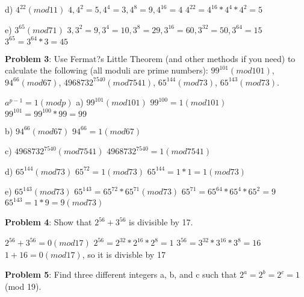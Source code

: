 \documentclass[12pt,letterpaper,final]{report}
\begin{document}
 d) $4^{22} (mod 11)$
\newline $4, 4^{2} = 5, 4^{4} = 3, 4^{8} = 9, 4^{16} = 4$
\newline $4^{22} = 4^{16} *  4^{4} *  4^{2} = 5$

 e) $3^{65} (mod 71)$
\newline $3, 3^{2} = 9, 3^{4} = 10, 3^{8} = 29, 3^{16} = 60, 3^{32} = 50, 3^{64} = 15$
\newline $3^{65} = 3^{64} * 3 = 45$

\bigskip

\bigskip
\noindent\textbf{Problem 3}: Use Fermat?s Little Theorem (and other methods if you need) to calculate the following (all moduli are prime numbers):  $99^{101} (mod 101)$,  $94^{66} (mod 67)$,  $4968732^{7540} (mod 7541)$,  $65^{144} (mod 73)$,  $65^{143} (mod 73)$.

\bigskip

$a^{p-1} = 1(mod p)$
 a) $99^{101}(mod 101)$
\newline $99^{100} = 1(mod 101)$
\newline $99^{101} = 99^{100} * 99 = 99$

 b) $94^{66} (mod 67)$
\newline $94^{66} = 1 (mod 67)$

 c)  $4968732^{7540} (mod 7541)$
\newline  $4968732^{7540} = 1 (mod 7541)$

 d) $65^{144} (mod 73)$
\newline $65^{72} = 1 (mod 73)$
\newline $65^{144} = 1 * 1 = 1  (mod 73)$

 e) $65^{143} (mod 73)$
\newline $65^{143} = 65^{72} * 65^{71} (mod 73)$
\newline $65^{71} = 65^{64} * 65^{4} * 65^{2} = 9$
\newline $65^{143} = 1 * 9 = 9(mod 73)$



\bigskip
\noindent\textbf{Problem 4}: Show that $2^{56} + 3^{56}$ is divisible by 17. 

 $2^{56} + 3^{56} = 0 (mod 17)$
\newline $2^{56} = 2^{32} * 2^{16} * 2^{8} = 1$
\newline $3^{56} = 3^{32} * 3^{16} * 3^{8} = 16$
\newline $1 + 16 = 0 (mod 17)$, so it is divisble by 17

\bigskip
\noindent\textbf{Problem 5}: Find three different integers a, b, and c such that $2^{a} = 2^{b} = 2^{c} = 1$ (mod 19).
\end{document}
